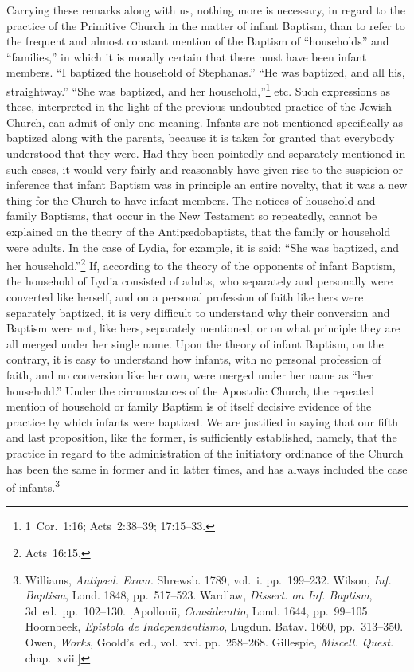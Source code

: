 \documentclass[
  english,
]{book}
\begin{document}
Carrying these remarks along with us, nothing more is necessary, in regard to the practice of the Primitive Church in the matter of infant Baptism, than to refer to the frequent and almost constant mention of the Baptism of ``households'' and ``families,'' in which it is morally certain that there must have been infant members. ``I baptized the household of Stephanas.'' ``He was baptized, and all his, straightway.'' ``She was baptized, and her household,''\footnote{1~Cor.~1:16; Acts~2:38--39; 17:15--33.} etc. Such expressions as these, interpreted in the light of the previous undoubted practice of the Jewish Church, can admit of only one meaning. Infants are not mentioned specifically as baptized along with the parents, because it is taken for granted that everybody understood that they were. Had they been pointedly and separately mentioned in such cases, it would very fairly and reasonably have given rise to the suspicion or inference that infant Baptism was in principle an entire novelty, that it was a new thing for the Church to have infant members. The notices of household and family Baptisms, that occur in the New Testament so repeatedly, cannot be explained on the theory of the Antipædobaptists, that the family or household were adults. In the case of Lydia, for example, it is said: ``She was baptized, and her household.''\footnote{Acts~16:15.} If, according to the theory of the opponents of infant Baptism, the household of Lydia consisted of adults, who separately and personally were converted like herself, and on a personal profession of faith like hers were separately baptized, it is very difficult to understand why their conversion and Baptism were not, like hers, separately mentioned, or on what principle they are all merged under her single name. Upon the theory of infant Baptism, on the contrary, it is easy to understand how infants, with no personal profession of faith, and no conversion like her own, were merged under her name as ``her household.'' Under the circumstances of the Apostolic Church, the repeated mention of household or family Baptism is of itself decisive evidence of the practice by which infants were baptized. We are justified in saying that our fifth and last proposition, like the former, is sufficiently established, namely, that the practice in regard to the administration of the initiatory ordinance of the Church has been the same in former and in latter times, and has always included the case of infants.\footnote{Williams, \emph{Antipæd. Exam.} Shrewsb. 1789, vol.~i. pp.~199--232. Wilson, \emph{Inf. Baptism}, Lond. 1848, pp.~517--523. Wardlaw, \emph{Dissert. on Inf. Baptism}, 3d~ed.~pp.~102--130. {[}Apollonii, \emph{Consideratio}, Lond. 1644, pp.~99--105. Hoornbeek, \emph{Epistola de Independentismo}, Lugdun. Batav. 1660, pp.~313--350. Owen, \emph{Works}, Goold's~ed., vol.~xvi. pp.~258--268. Gillespie, \emph{Miscell. Quest.} chap.~xvii.{]}}
\end{document}
